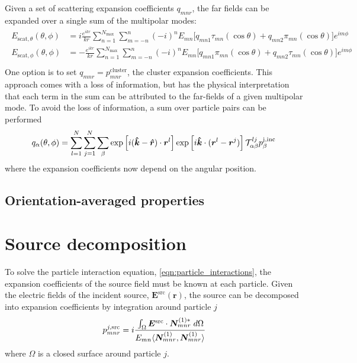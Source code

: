 \documentclass[11pt]{article}
\begin{document}
Given a set of scattering expansion coefficients $q_{mnr}$, the far fields can be expanded over a single sum of the multipolar modes:
\begin{align}
\begin{split}
    E_{\text{scat},\theta}(\theta,\phi) &= i\frac{e^{ikr}}{kr} \sum_{n=1}^{N_\text{max}} \sum_{m=-n}^{n}
    (-i)^nE_{mn} \big[q_{mn1}\tau_{mn}(\cos\theta) + q_{mn2}\pi_{mn}(\cos\theta)\big] e^{im\phi} \\
    E_{\text{scat},\phi}(\theta,\phi) &= -\frac{e^{ikr}}{kr} \sum_{n=1}^{N_\text{max}} \sum_{m=-n}^{n}
    (-i)^nE_{mn} \big[q_{mn1}\pi_{mn}(\cos\theta) + q_{mn2}\tau_{mn}(\cos\theta)\big] e^{im\phi} \\
\end{split}
\end{align}
One option is to set $q_{mnr} = p_{mnr}^\text{cluster}$, the cluster expansion coefficients.
This approach comes with a loss of information, but has the physical interpretation that each term in the sum can be attributed to the far-fields of a given multipolar mode.
To avoid the loss of information, a sum over particle pairs can be performed \cite{Xu_1997}
\begin{equation}
    q_{\alpha}(\theta, \phi) = \sum_{l=1}^N \sum_{j=1}^N \sum_\beta 
                 \exp \left[i(\bm{\hat k} - \bm{\hat r}) \cdot \bm{r}^l\right]
                 \exp \left[i \bm{\hat k} \cdot (\bm{r}^l - \bm{r}^j) \right]
                 \mathcal{T}_{\alpha \beta}^{lj} p_{\beta}^\text{j,\text{inc}}
\end{equation}
where the expansion coefficients now depend on the angular position.

\subsection{Orientation-averaged properties}

\section{Source decomposition}
To solve the particle interaction equation, \cref{eqn:particle_interactions}, the expansion coefficients of the source field must be known at each particle.
Given the electric fields of the incident source, $\boldsymbol{E}^\text{src}(\boldsymbol{r})$, the source can be decomposed into expansion coefficients by integration around particle $j$
\begin{equation}
    p_{mnr}^{j,\text{src}} = i\cfrac{\int_\Omega \boldsymbol{E}^\text{src} \cdot \boldsymbol{N}_{mnr}^{(1)*} \; d\Omega}
    {E_{mn} \langle \boldsymbol{N}_{mnr}^{(1)},\boldsymbol{N}_{mnr}^{(1)} \rangle} \\
\end{equation}
where $\Omega$ is a closed surface around particle $j$.
\end{document}
